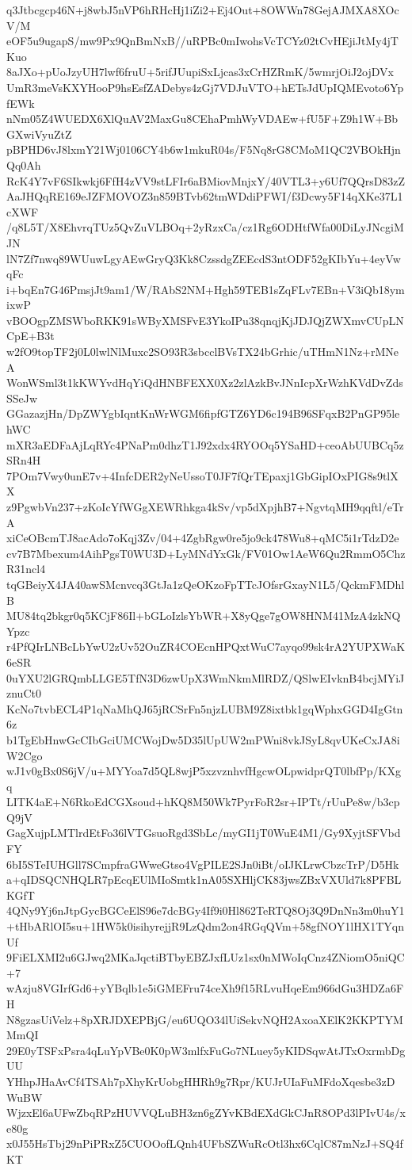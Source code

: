 q3Jtbcgcp46N+j8wbJ5nVP6hRHcHj1iZi2+Ej4Out+8OWWn78GejAJMXA8XOcV/M
eOF5u9ugapS/mw9Px9QnBmNxB//uRPBc0mIwohsVcTCYz02tCvHEjiJtMy4jTKuo
8aJXo+pUoJzyUH7lwf6fruU+5rifJUupiSxLjcas3xCrHZRmK/5wmrjOiJ2ojDVx
UmR3meVsKXYHooP9hsEsfZADebys4zGj7VDJuVTO+hETsJdUpIQMEvoto6YpfEWk
nNm05Z4WUEDX6XlQuAV2MaxGu8CEhaPmhWyVDAEw+fU5F+Z9h1W+BbGXwiVyuZtZ
pBPHD6vJ8lxmY21Wj0106CY4b6w1mkuR04s/F5Nq8rG8CMoM1QC2VBOkHjnQq0Ah
RcK4Y7vF6SIkwkj6FfH4zVV9stLFIr6aBMiovMnjxY/40VTL3+y6Uf7QQrsD83zZ
AaJHQqRE169eJZFMOVOZ3n859BTvb62tmWDdiPFWI/f3Dcwy5F14qXKe37L1cXWF
/q8L5T/X8EhvrqTUz5QvZuVLBOq+2yRzxCa/cz1Rg6ODHtfWfa00DiLyJNcgiMJN
lN7Zf7nwq89WUuwLgyAEwGryQ3Kk8CzssdgZEEcdS3ntODF52gKIbYu+4eyVwqFc
i+bqEn7G46PmsjJt9am1/W/RAbS2NM+Hgh59TEB1sZqFLv7EBn+V3iQb18ymixwP
vBOOgpZMSWboRKK91sWByXMSFvE3YkoIPu38qnqjKjJDJQjZWXmvCUpLNCpE+B3t
w2fO9topTF2j0L0lwlNlMuxc2SO93R3sbcclBVsTX24bGrhic/uTHmN1Nz+rMNeA
WonWSml3t1kKWYvdHqYiQdHNBFEXX0Xz2zlAzkBvJNnIcpXrWzhKVdDvZdsSSeJw
GGazazjHn/DpZWYgbIqntKnWrWGM6fipfGTZ6YD6c194B96SFqxB2PnGP95lehWC
mXR3aEDFaAjLqRYc4PNaPm0dhzT1J92xdx4RYOOq5YSaHD+ceoAbUUBCq5zSRn4H
7POm7Vwy0unE7v+4InfcDER2yNeUssoT0JF7fQrTEpaxj1GbGipIOxPIG8s9tlXX
z9PgwbVn237+zKoIcYfWGgXEWRhkga4kSv/vp5dXpjhB7+NgvtqMH9qqftl/eTrA
xiCeOBcmTJ8acAdo7oKqj3Zv/04+4ZgbRgw0re5jo9ck478Wu8+qMC5i1rTdzD2e
cv7B7Mbexum4AihPgsT0WU3D+LyMNdYxGk/FV01Ow1AeW6Qu2RmmO5ChzR31ncl4
tqGBeiyX4JA40awSMcnvcq3GtJa1zQeOKzoFpTTcJOfsrGxayN1L5/QckmFMDhlB
MU84tq2bkgr0q5KCjF86Il+bGLoIzlsYbWR+X8yQge7gOW8HNM41MzA4zkNQYpzc
r4PfQIrLNBcLbYwU2zUv52OuZR4COEcnHPQxtWuC7ayqo99sk4rA2YUPXWaK6eSR
0uYXU2lGRQmbLLGE5TfN3D6zwUpX3WmNkmMlRDZ/QSlwEIvknB4bcjMYiJznuCt0
KcNo7tvbECL4P1qNaMhQJ65jRCSrFn5njzLUBM9Z8ixtbk1gqWphxGGD4IgGtn6z
b1TgEbHnwGcCIbGciUMCWojDw5D35lUpUW2mPWni8vkJSyL8qvUKeCxJA8iW2Cgo
wJ1v0gBx0S6jV/u+MYYoa7d5QL8wjP5xzvznhvfHgcwOLpwidprQT0lbfPp/KXgq
LITK4aE+N6RkoEdCGXsoud+hKQ8M50Wk7PyrFoR2sr+IPTt/rUuPe8w/b3cpQ9jV
GagXujpLMTlrdEtFo36lVTGsuoRgd3SbLc/myGI1jT0WuE4M1/Gy9XyjtSFVbdFY
6bI5STeIUHGll7SCmpfraGWweGtso4VgPILE2SJn0iBt/oIJKLrwCbzcTrP/D5Hk
a+qIDSQCNHQLR7pEcqEUlMIoSmtk1nA05SXHljCK83jwsZBxVXUld7k8PFBLKGfT
4QNy9Yj6nJtpGycBGCeElS96e7dcBGy4If9i0Hl862TeRTQ8Oj3Q9DnNn3m0huY1
+tHbARlOI5su+1HW5k0isihyrejjR9LzQdm2on4RGqQVm+58gfNOY1lHX1TYqnUf
9FiELXMI2u6GJwq2MKaJqctiBTbyEBZJxfLUz1sx0nMWoIqCnz4ZNiomO5niQC+7
wAzju8VGIrfGd6+yYBqlb1e5iGMEFru74ceXh9f15RLvuHqeEm966dGu3HDZa6FH
N8gzasUiVelz+8pXRJDXEPBjG/eu6UQO34lUiSekvNQH2AxoaXElK2KKPTYMMmQI
29E0yTSFxPsra4qLuYpVBe0K0pW3mlfxFuGo7NLuey5yKIDSqwAtJTxOxrmbDgUU
YHhpJHaAvCf4TSAh7pXhyKrUobgHHRh9g7Rpr/KUJrUIaFuMFdoXqesbe3zDWuBW
WjzxEl6aUFwZbqRPzHUVVQLuBH3zn6gZYvKBdEXdGkCJnR8OPd3lPIvU4s/xe80g
x0J55HsTbj29nPiPRxZ5CUOOofLQnh4UFbSZWuRcOtl3hx6CqlC87mNzJ+SQ4fKT
